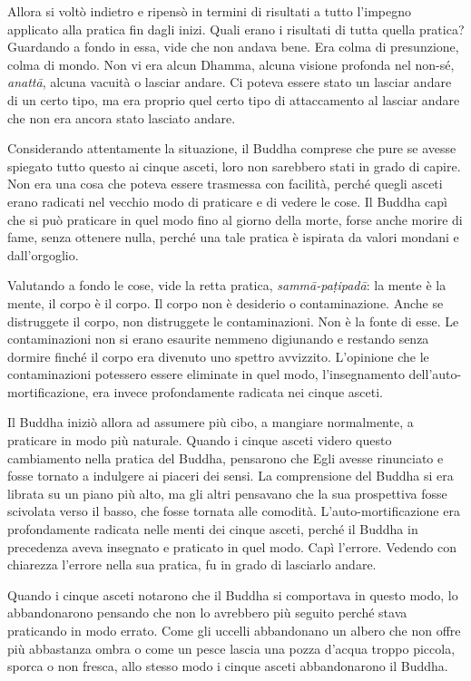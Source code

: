 Allora si voltò indietro e ripensò in termini di risultati a tutto
l'impegno applicato alla pratica fin dagli inizi. Quali erano i
risultati di tutta quella pratica? Guardando a fondo in essa, vide che
non andava bene. Era colma di presunzione, colma di mondo. Non vi era
alcun Dhamma, alcuna visione profonda nel non-sé, \emph{anattā}, alcuna
vacuità o lasciar andare. Ci poteva essere stato un lasciar andare di un
certo tipo, ma era proprio quel certo tipo di attaccamento al lasciar
andare che non era ancora stato lasciato andare.

Considerando attentamente la situazione, il Buddha comprese che pure se
avesse spiegato tutto questo ai cinque asceti, loro non sarebbero stati
in grado di capire. Non era una cosa che poteva essere trasmessa con
facilità, perché quegli asceti erano radicati nel vecchio modo di
praticare e di vedere le cose. Il Buddha capì che si può praticare in
quel modo fino al giorno della morte, forse anche morire di fame, senza
ottenere nulla, perché una tale pratica è ispirata da valori mondani e
dall'orgoglio.

Valutando a fondo le cose, vide la retta pratica, \emph{sammā-paṭipadā}:
la mente è la mente, il corpo è il corpo. Il corpo non è desiderio o
contaminazione. Anche se distruggete il corpo, non distruggete le
contaminazioni. Non è la fonte di esse. Le contaminazioni non si erano
esaurite nemmeno digiunando e restando senza dormire finché il corpo era
divenuto uno spettro avvizzito. L'opinione che le contaminazioni
potessero essere eliminate in quel modo, l'insegnamento
dell'auto-mortificazione, era invece profondamente radicata nei cinque
asceti.

Il Buddha iniziò allora ad assumere più cibo, a mangiare normalmente, a
praticare in modo più naturale. Quando i cinque asceti videro questo
cambiamento nella pratica del Buddha, pensarono che Egli avesse
rinunciato e fosse tornato a indulgere ai piaceri dei sensi. La
comprensione del Buddha si era librata su un piano più alto, ma gli
altri pensavano che la sua prospettiva fosse scivolata verso il basso,
che fosse tornata alle comodità. L'auto-mortificazione era profondamente
radicata nelle menti dei cinque asceti, perché il Buddha in precedenza
aveva insegnato e praticato in quel modo. Capì l'errore. Vedendo con
chiarezza l'errore nella sua pratica, fu in grado di lasciarlo andare.

Quando i cinque asceti notarono che il Buddha si comportava in questo
modo, lo abbandonarono pensando che non lo avrebbero più seguito perché
stava praticando in modo errato. Come gli uccelli abbandonano un albero
che non offre più abbastanza ombra o come un pesce lascia una pozza
d'acqua troppo piccola, sporca o non fresca, allo stesso modo i cinque
asceti abbandonarono il Buddha.

